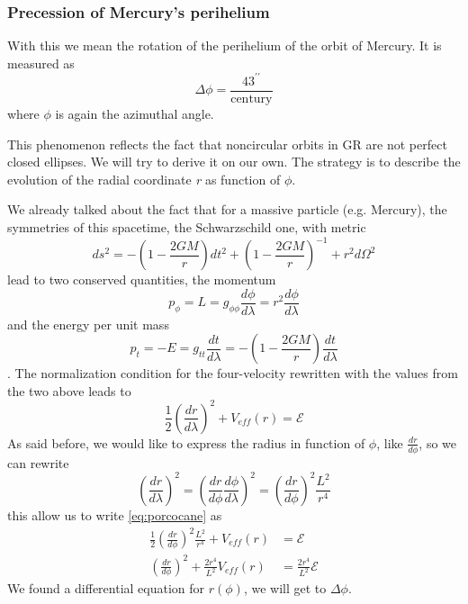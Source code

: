 \subsubsection{Precession of Mercury's perihelium}
With this we mean the rotation of the perihelium of the orbit of Mercury. It is measured as 
\[
\Delta \phi = \frac{43^{\prime \prime }}{\text{century}}
\]
where $\phi $ is again the azimuthal angle. \par
This phenomenon reflects the fact that noncircular orbits in GR are not perfect closed ellipses. We will try to derive it on our own. The strategy is to describe the evolution of the radial coordinate \emph{r} as function of $\phi $.\par
We already talked about the fact that for a massive particle (e.g. Mercury), the symmetries of this spacetime, the Schwarzschild one, with metric
\[
ds^{2} = -\left( 1- \frac{2GM}{r} \right)dt^{2} + \left( 1- \frac{2GM}{r} \right)^{-1} + r^{2}d\Omega ^{2}
\]
lead to two conserved quantities, the momentum
\begin{equation}
	p_{\phi } = L = g_{\phi \phi } \frac{d \phi }{d \lambda } = r^{2} \frac{d \phi }{d \lambda }
\end{equation}
and the energy per unit mass
\begin{equation}
p_{t} = - E = g_{tt}\frac{d t}{d \lambda } = - \left( 1- \frac{2GM}{r} \right) \frac{d t }{d \lambda }
\end{equation}.
The normalization condition for the four-velocity rewritten with the values from the two above leads to
\begin{equation}\label{eq:porcocane}
\frac{1}{2}\left( \frac{d r}{d \lambda } \right)^{2} + V_{eff}\left( r \right) = \mathcal{E}
\end{equation}
As said before, we would like to express the radius in function of $\phi $, like $\frac{d r}{d \phi }$, so we can rewrite
\begin{equation}
	\left( \frac{d r}{d \lambda } \right) ^{2} = \left( \frac{d r}{d \phi } \frac{d \phi }{d \lambda } \right)^{2} = \left( \frac{d r}{d \phi } \right)^{2} \frac{L^{2}}{r^{4}}
\end{equation}
this allow us to write \ref{eq:porcocane} as 
\begin{align}
	\frac{1}{2} \left( \frac{d r}{d \phi } \right)^{2} \frac{L^{2}}{r^{4}} + V_{eff}\left( r \right) &= \mathcal{E} \label{eq:343}\\
	\left( \frac{d r}{d \phi } \right)^{2} + \frac{2r^{4}}{L^{2}}V_{eff}\left( r \right) &= \frac{2r^{4}}{L^{2}}\mathcal{E}	
\end{align}
We found a differential equation for $r\left( \phi  \right)$, we will get to $\Delta \phi $.
















